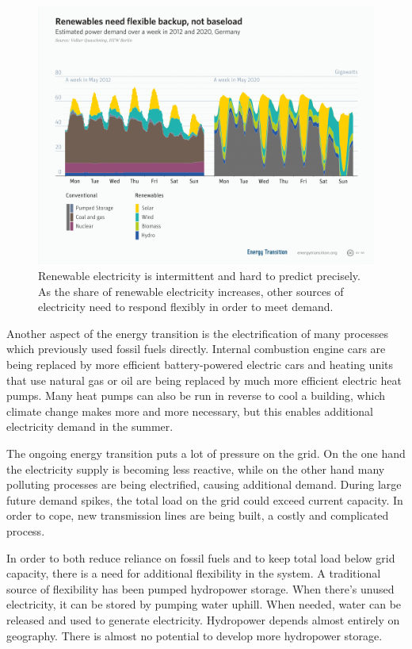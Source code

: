 \begin{figure}
    \includegraphics[width = \linewidth]{figures/flexible_renewables.png}
    \caption{Renewable electricity is intermittent and hard to predict precisely. As the share of renewable electricity increases, other sources of electricity need to respond flexibly in order to meet demand.}
    \label{fig:flexibility}
\end{figure}


Another aspect of the energy transition is the electrification of many processes which previously used fossil fuels directly.
Internal combustion engine cars are being replaced by more efficient battery-powered electric cars and heating units that use natural gas or oil are being replaced by much more efficient electric heat pumps.
Many heat pumps can also be run in reverse to cool a building, which climate change makes more and more necessary, but this enables additional electricity demand in the summer.

The ongoing energy transition puts a lot of pressure on the grid.
On the one hand the electricity supply is becoming less reactive, while on the other hand many polluting processes are being electrified, causing additional demand.
During large future demand spikes, the total load on the grid could exceed current capacity. In order to cope, new transmission lines are being built, a costly and complicated process.

In order to both reduce reliance on fossil fuels and to keep total load below grid capacity, there is a need for additional flexibility in the system.
A traditional source of flexibility has been pumped hydropower storage.
When there's unused electricity, it can be stored by pumping water uphill.
When needed, water can be released and used to generate electricity. 
Hydropower depends almost entirely on geography. There is almost no potential to develop more hydropower storage.

